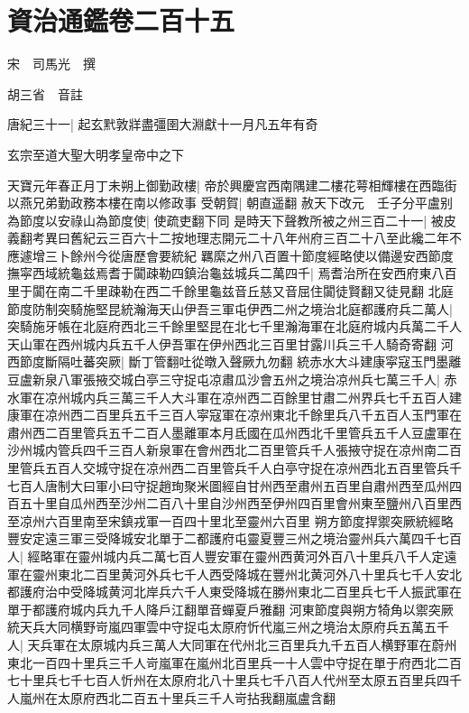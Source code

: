 \chapter{資治通鑑卷二百十五}
宋　司馬光　撰

胡三省　音註

唐紀三十一|{
	起玄黓敦牂盡彊圉大淵獻十一月凡五年有奇}


玄宗至道大聖大明孝皇帝中之下

天寶元年春正月丁未朔上御勤政樓|{
	帝於興慶宫西南隅建二樓花萼相輝樓在西臨街以燕兄弟勤政務本樓在南以修政事}
受朝賀|{
	朝直遥翻}
赦天下改元　壬子分平盧别為節度以安祿山為節度使|{
	使疏吏翻下同}
是時天下聲教所被之州三百二十一|{
	被皮義翻考異曰舊紀云三百六十二按地理志開元二十八年州府三百二十八至此纔二年不應遽增三卜餘州今從唐歷會要統紀}
羈縻之州八百置十節度經略使以備邊安西節度撫寜西域統龜兹焉耆于闐疎勒四鎮治龜兹城兵二萬四千|{
	焉耆治所在安西府東八百里于闐在南二千里疎勒在西二千餘里龜兹音丘慈又音屈住闐徒賢翻又徒見翻}
北庭節度防制突騎施堅昆統瀚海天山伊吾三軍屯伊西二州之境治北庭都護府兵二萬人|{
	突騎施牙帳在北庭府西北三千餘里堅昆在北七千里瀚海軍在北庭府城内兵萬二千人天山軍在西州城内兵五千人伊吾軍在伊州西北三百里甘露川兵三千人騎奇寄翻}
河西節度斷隔吐蕃突厥|{
	斷丁管翻吐從暾入聲厥九勿翻}
統赤水大斗建康寜寇玉門墨離豆盧新泉八軍張掖交城白亭三守捉屯凉肅瓜沙會五州之境治凉州兵七萬三千人|{
	赤水軍在凉州城内兵三萬三千人大斗軍在凉州西二百餘里甘肅二州界兵七千五百人建康軍在凉州西二百里兵五千三百人寜寇軍在凉州東北千餘里兵八千五百人玉門軍在肅州西二百里管兵五千二百人墨離軍本月氐國在瓜州西北千里管兵五千人豆盧軍在沙州城内管兵四千三百人新泉軍在會州西北二百里管兵千人張掖守捉在凉州南二百里管兵五百人交城守捉在凉州西二百里管兵千人白亭守捉在凉州西北五百里管兵千七百人唐制大曰軍小曰守捉趙珣聚米圖經自甘州西至肅州五百里自肅州西至瓜州四百五十里自瓜州西至沙州二百八十里自沙州西至伊州四百里會州東至鹽州八百里西至凉州六百里南至宋鎮戎軍一百四十里北至靈州六百里}
朔方節度捍禦突厥統經略豐安定遠三軍三受降城安北單于二都護府屯靈夏豐三州之境治靈州兵六萬四千七百人|{
	經略軍在靈州城内兵二萬七百人豐安軍在靈州西黄河外百八十里兵八千人定遠軍在靈州東北二百里黄河外兵七千人西受降城在豐州北黄河外八十里兵七千人安北都護府治中受降城黄河北岸兵六千人東受降城在勝州東北二百里兵七千人振武軍在單于都護府城内兵九千人降戶江翻單音蟬夏戶雅翻}
河東節度與朔方犄角以禦突厥統天兵大同横野岢嵐四軍雲中守捉屯太原府忻代嵐三州之境治太原府兵五萬五千人|{
	天兵軍在太原城内兵三萬人大同軍在代州北三百里兵九千五百人横野軍在蔚州東北一百四十里兵三千人岢嵐軍在嵐州北百里兵一十人雲中守捉在單于府西北二百七十里兵七千七百人忻州在太原府北八十里兵七千八百人代州至太原五百里兵四千人嵐州在太原府西北二百五十里兵三千人岢拈我翻嵐盧含翻}
